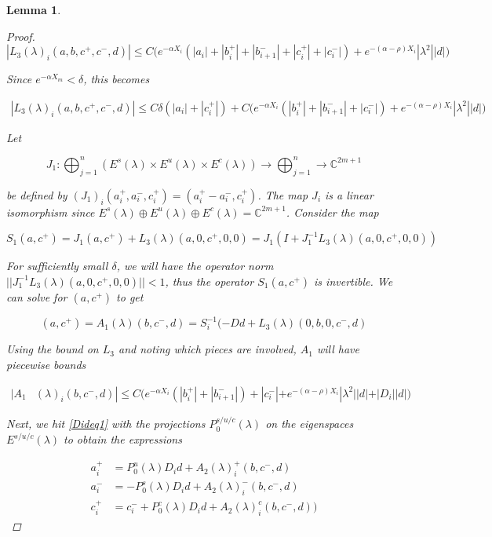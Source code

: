 \documentclass[12pt]{article}
\def\C{{\mathbb C}}
\newtheorem{lemma}{Lemma}
\begin{document}
\begin{lemma}
\begin{proof}
\begin{equation}\label{L3bound}
|L_3(\lambda)_i(a, b, c^+, c^-, d)| \leq C \Big( e^{-\alpha X_i} ( |a_i| + |b_i^+| + |b_{i+1}^-| + |c_i^+| + |c_i^-|) + e^{-(\alpha - \rho) X_i} |\lambda^2| |d| \Big)
\end{equation}

Since $e^{-\alpha X_m} < \delta$, this becomes

\begin{align*}
|L_3(\lambda)_i(a, b, c^+, c^-, d)| \leq C \delta ( |a_i| + |c_i^+| ) + C\Big( e^{-\alpha X_i} ( |b_i^+| + |b_{i+1}^-| + |c_i^-|) + e^{-(\alpha - \rho) X_i} |\lambda^2| |d| \Big)
\end{align*}

Let 

\[
J_1: \bigoplus_{j=1}^n (E^s(\lambda) \times E^u(
\lambda) \times E^c(\lambda) ) \rightarrow \bigoplus_{j=1}^n \rightarrow \C^{2m+1}
\]

be defined by $(J_1)_i(a_i^+, a_i^-, c_i^+) = (a_i^+ - a_i^-, c_i^+)$. The map $J_i$ is a linear isomorphism since $E^s(\lambda) \oplus E^u(\lambda) \oplus E^c(\lambda) = \C^{2m + 1}$. Consider the map

\[
S_1(a, c^+) = J_1 (a, c^+) + L_3(\lambda)(a, 0, c^+, 0, 0) = J_1( I + J_1^{-1} L_3(\lambda)(a, 0, c^+, 0, 0))
\]

For sufficiently small $\delta$, we will have the operator norm $||J_1^{-1} L_3(\lambda)(a, 0, c^+, 0, 0)|| < 1$, thus the operator $S_1(a, c^+)$ is invertible. We can solve for $(a, c^+)$ to get

\[
(a, c^+) = A_1(\lambda)(b, c^-, d) = S_i^{-1}(-D d + L_3(\lambda)(0, b, 0, c^-, d)
\]

Using the bound on $L_3$ and noting which pieces are involved, $A_1$ will have piecewise bounds

\begin{align*}
|A_1&(\lambda)_i(b, c^-, d)|
\leq C \Big( e^{-\alpha X_i} (|b_i^+| + |b_{i+1}^-|) + |c_i^-| + e^{-(\alpha - \rho) X_i} |\lambda^2||d| + |D_i||d| \Big)
\end{align*} 

Next, we hit \eqref{Dideq1} with the projections $P_0^{s/u/c}(\lambda)$ on the eigenspaces $E^{s/u/c}(\lambda)$ to obtain the expressions

\begin{align*}
a_i^+ &= P_0^u(\lambda) D_i d + A_2(\lambda)_i^+(b, c^-, d) \\
a_i^- &= -P_0^s(\lambda) D_i d + A_2(\lambda)_i^-(b, c^-, d) \\
c_i^+ &= c_i^- + P_0^c(\lambda) D_i d + A_2(\lambda)_i^c(b, c^-, d) )
\end{align*}


\end{proof}
\end{lemma}
\end{document}
